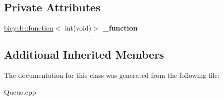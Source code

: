 \subsection*{Private Attributes}
\begin{DoxyCompactItemize}
\item 
\mbox{\label{class_dispatch_queue___llambda_task_a32acee7d526ff77f7d1c3fc02d5bec0d}} 
\hyperlink{classbicycle_1_1function}{bicycle\+::function}$<$ int(void)$>$ {\bfseries \+\_\+function}
\end{DoxyCompactItemize}
\subsection*{Additional Inherited Members}


The documentation for this class was generated from the following file\+:\begin{DoxyCompactItemize}
\item 
Queue.\+cpp\end{DoxyCompactItemize}
